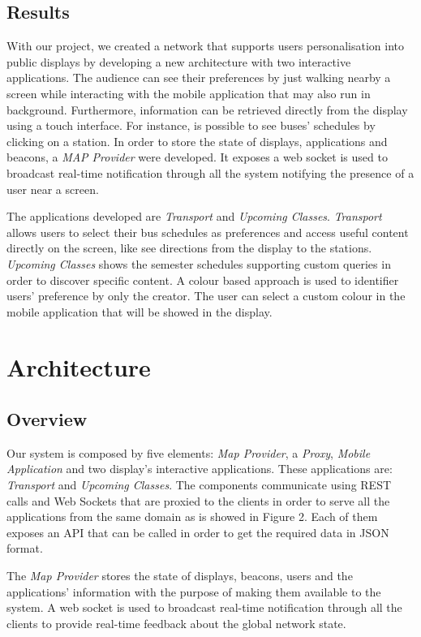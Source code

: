 \documentclass[]{usiinfbachelorproject}
\begin{document}
\subsection{Results}
With our project, we created a network that supports users personalisation into public displays by developing a new architecture with two interactive applications. The audience can see their preferences by just walking nearby a screen while interacting with the mobile application that may also run in background. Furthermore, information can be retrieved directly from the display using a touch interface. For instance, is possible to see buses' schedules by clicking on a station. In order to store the state of displays, applications and beacons, a \emph{MAP Provider} were developed. It exposes a web socket is used to broadcast real-time notification through all the system notifying the presence of a user near a screen.

The applications developed are \emph{Transport} and \emph{Upcoming Classes}. \emph{Transport} allows users to select their bus schedules as preferences and access useful content directly on the screen, like see directions from the display to the stations.
\emph{Upcoming Classes} shows the semester schedules supporting custom queries in order to discover specific content. A colour based approach is used to identifier users' preference by only the creator. The user can select a custom colour in the mobile application that will be showed in the display.

\section{Architecture}
\subsection{Overview}
Our system is composed by five elements: \emph{Map Provider}, a \emph{Proxy}, \emph{Mobile Application} and two display's interactive applications. These applications are: \emph{Transport} and \emph{Upcoming Classes}. The components communicate using REST calls and Web Sockets that are proxied to the clients in order to serve all the applications from the same domain as is showed in Figure 2. Each of them exposes an API that can be called in order to get the required data in JSON format.

The \emph{Map Provider} stores the state of displays, beacons, users and the applications' information with the purpose of making them available to the system. A web socket is used to broadcast real-time notification through all the clients to provide real-time feedback about the global network state.
\end{document}
